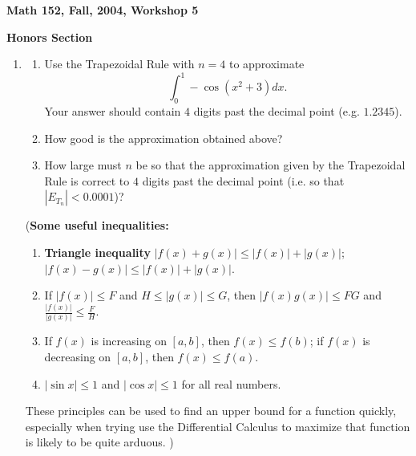 \documentclass[12pt]{article}
\begin{document}
\begin{center}

{\large \bf Math 152, Fall, 2004, Workshop 5\par}
\vspace{.5cm}
{{\bf Honors Section} 
\par}
\end{center}



\begin{enumerate}


\item \begin{enumerate}

\item Use the Trapezoidal Rule with $n=4$ to approximate 
$$\int_{0}^{1}-\cos(x^{2}+3) dx.$$
Your answer 
should contain $4$ digits past the decimal point (e.g. $1.2345$).

\item How good is the approximation obtained above?

\item How large must $n$ be so that the approximation given by the 
Trapezoidal Rule is correct to $4$ digits past the decimal point 
(i.e. so that $|E_{T_{n}}|<0.0001$)? 

\end{enumerate}

\noindent ({\bf Some useful inequalities:} 

\begin{enumerate}

\item {\bf Triangle inequality} $|f(x)+g(x)|\le |f(x)|+|g(x)|$; 
$|f(x)-g(x)|\le |f(x)|+|g(x)|$.

\item If $|f(x)|\le F$ and $H\le |g(x)|\le G$, then $|f(x)g(x)|\le FG$
and ${\displaystyle \frac{|f(x)|}{|g(x)|}\le \frac{F}{H}}$.

\item If $f(x)$ is increasing on $[a, b]$, then $f(x)\le f(b)$;
if $f(x)$ is decreasing on $[a, b]$, then $f(x)\le f(a)$.

\item $|\sin x|\le 1$ and $|\cos x|\le 1$ for all real numbers.

\end{enumerate}
These principles can be used to find an upper bound for a function quickly,
especially when trying use the Differential Calculus to maximize that 
function is likely to be quite arduous. )



\end{enumerate}
\end{document}
